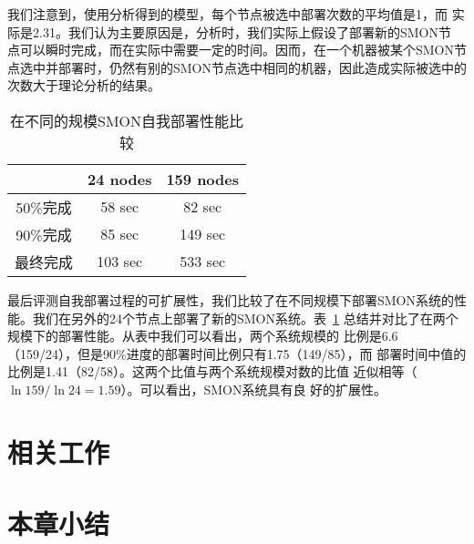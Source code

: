 我们注意到，使用分析得到的模型，每个节点被选中部署次数的平均值是1，而
实际是2.31。我们认为主要原因是，分析时，我们实际上假设了部署新的SMON节
点可以瞬时完成，而在实际中需要一定的时间。因而，在一个机器被某个SMON节
点选中并部署时，仍然有别的SMON节点选中相同的机器，因此造成实际被选中的
次数大于理论分析的结果。


\begin{table}
\centering
  \begin{minipage}{0.8\linewidth}
    \centering
    \caption{在不同的规模SMON自我部署性能比较}
    \label{fig:scalability}
    \begin{tabular}{ccc}
    \toprule[1.5pt]
           & 24 nodes & 159 nodes\\
    \midrule[1pt]
    50\%完成 & 58 sec & 82 sec \\
    90\%完成 & 85 sec & 149 sec\\
    最终完成 & 103 sec & 533 sec\\
    \bottomrule[1.5pt]
    \end{tabular}
  \end{minipage}
\end{table}

最后评测自我部署过程的可扩展性，我们比较了在不同规模下部署SMON系统的性
能。我们在另外的24个节点上部署了新的SMON系统。表~\ref{fig:scalability}
总结并对比了在两个规模下的部署性能。从表中我们可以看出，两个系统规模的
比例是6.6（159/24），但是90\%进度的部署时间比例只有1.75（149/85），而
部署时间中值的比例是1.41（82/58）。这两个比值与两个系统规模对数的比值
近似相等（$\ln 159/\ln 24 = 1.59$）。可以看出，SMON系统具有良
好的扩展性。

\section{相关工作}
\label{sec:smon_related}

\section{本章小结}
\label{sec:smon_conclusion}
